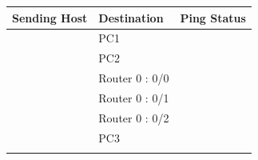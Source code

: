 \documentclass[a4paper,11pt]{article}
\begin{document}
\begin{enumerate}
\begin{table}[H]
              \begin{tabular}{| m{10em}| m{10em}| m{10em} |}
                  \hline
                  \multicolumn{1}{|l|}{\textbf{Sending Host}}                     & \textbf{Destination} & \multicolumn{1}{l|}{\textbf{Ping Status}}                                 \\
                  \hline
                  {\cellcolor[rgb]{0.141,0.525,1}}                                & PC1                  & {\cellcolor[rgb]{1,0.169,0.082}}                                          \\
                  \hhline{|>{\arrayrulecolor[rgb]{0.141,0.525,1}}->{\arrayrulecolor{black}}->{\arrayrulecolor[rgb]{1,0.169,0.082}}->{\arrayrulecolor{black}}|}
                  {\cellcolor[rgb]{0.141,0.525,1}}                                & PC2                  & {\cellcolor[rgb]{1,0.169,0.082}}                                          \\
                  \hhline{|>{\arrayrulecolor[rgb]{0.141,0.525,1}}->{\arrayrulecolor{black}}->{\arrayrulecolor[rgb]{1,0.169,0.082}}->{\arrayrulecolor{black}}|}
                  {\cellcolor[rgb]{0.141,0.525,1}}                                & Router 0 : 0/0       & {\cellcolor[rgb]{1,0.169,0.082}}                                          \\
                  \hhline{|>{\arrayrulecolor[rgb]{0.141,0.525,1}}->{\arrayrulecolor{black}}->{\arrayrulecolor[rgb]{1,0.169,0.082}}->{\arrayrulecolor{black}}|}
                  {\cellcolor[rgb]{0.141,0.525,1}}                                & Router 0 : 0/1       & {\cellcolor[rgb]{1,0.169,0.082}}                                          \\
                  \hhline{|>{\arrayrulecolor[rgb]{0.141,0.525,1}}->{\arrayrulecolor{black}}->{\arrayrulecolor[rgb]{1,0.169,0.082}}->{\arrayrulecolor{black}}|}
                  {\cellcolor[rgb]{0.141,0.525,1}}                                & Router 0 : 0/2       & {\cellcolor[rgb]{1,0.169,0.082}}                                          \\
                  \hhline{|>{\arrayrulecolor[rgb]{0.141,0.525,1}}->{\arrayrulecolor{black}}->{\arrayrulecolor[rgb]{1,0.169,0.082}}->{\arrayrulecolor{black}}|}
                  {\cellcolor[rgb]{0.141,0.525,1}}                                & PC3                  & {\cellcolor[rgb]{1,0.169,0.082}}                                          \\
                  \hhline{|>{\arrayrulecolor[rgb]{0.141,0.525,1}}->{\arrayrulecolor{black}}->{\arrayrulecolor[rgb]{1,0.169,0.082}}->{\arrayrulecolor{black}}|}

\end{tabular}
\end{table}
\end{enumerate}
\end{document}
